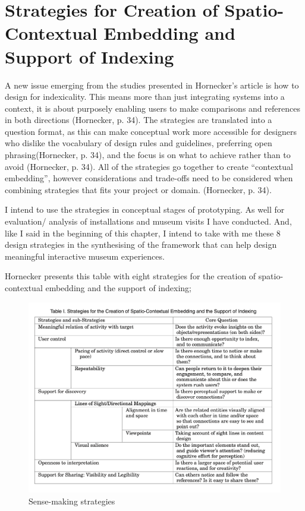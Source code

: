\section{Strategies for Creation of Spatio-Contextual Embedding and Support of Indexing}
A new issue emerging from the studies presented in Hornecker’s article is how to design for indexicality. This means more than just integrating systems into a context, it is about purposely enabling users to make comparisons and references in both directions (Hornecker, p. 34). The strategies are translated into a question format, as this can make conceptual work more accessible for designers who dislike the vocabulary of design rules and guidelines, preferring open phrasing(Hornecker, p. 34), and the focus is on what to achieve rather than to avoid (Hornecker, p. 34). All of the strategies go together to create “contextual embedding”, however considerations and trade-offs need to be considered when combining strategies that fits your project or domain. (Hornecker, p. 34).

I intend to use the strategies in conceptual stages of prototyping. As well for evaluation/ analysis of installations and museum visits I have conducted. And, like I said in the beginning of this chapter, I intend to take with me these 8 design strategies in the synthesising of the framework that can help design meaningful interactive museum experiences. 

Hornecker presents this table with eight strategies for the creation of spatio-contextual embedding and the support of indexing;

\begin{figure}[H]
\includegraphics[width=12.5cm]{pictures/strategies.png}
\caption{Sense-making strategies}
\centering 
\end{figure}